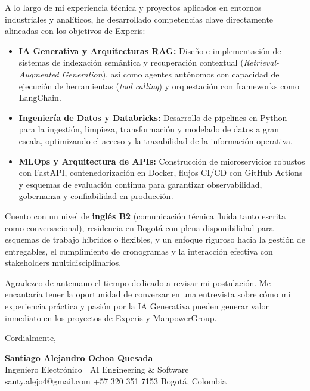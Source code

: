 \documentclass[11pt,a4paper]{article}
\begin{document}
A lo largo de mi experiencia técnica y proyectos aplicados en entornos industriales y analíticos, he desarrollado competencias clave directamente alineadas con los objetivos de Experis:

\begin{itemize}[label={\color{accentblue}\raisebox{0.2ex}{\tiny\faCircle}}, leftmargin=1.4em, itemsep=3pt, parsep=0pt, topsep=2pt]
    \item \textbf{IA Generativa y Arquitecturas RAG:} Diseño e implementación de sistemas de indexación semántica y recuperación contextual (\textit{Retrieval-Augmented Generation}), así como agentes autónomos con capacidad de ejecución de herramientas (\textit{tool calling}) y orquestación con frameworks como LangChain.
    \item \textbf{Ingeniería de Datos y Databricks:} Desarrollo de pipelines en Python para la ingestión, limpieza, transformación y modelado de datos a gran escala, optimizando el acceso y la trazabilidad de la información operativa.
    \item \textbf{MLOps y Arquitectura de APIs:} Construcción de microservicios robustos con FastAPI, contenedorización en Docker, flujos CI/CD con GitHub Actions y esquemas de evaluación continua para garantizar observabilidad, gobernanza y confiabilidad en producción.
\end{itemize}

Cuento con un nivel de \textbf{inglés B2} (comunicación técnica fluida tanto escrita como conversacional), residencia en Bogotá con plena disponibilidad para esquemas de trabajo híbridos o flexibles, y un enfoque riguroso hacia la gestión de entregables, el cumplimiento de cronogramas y la interacción efectiva con stakeholders multidisciplinarios.

Agradezco de antemano el tiempo dedicado a revisar mi postulación. Me encantaría tener la oportunidad de conversar en una entrevista sobre cómo mi experiencia práctica y pasión por la IA Generativa pueden generar valor inmediato en los proyectos de Experis y ManpowerGroup.

\vspace{10pt}
\noindent Cordialmente,

\vspace{12pt}
\noindent
\textbf{\large\color{accent} Santiago Alejandro Ochoa Quesada}\\
{\small\color{subtletext} Ingeniero Electrónico | AI Engineering \& Software}\\
{\footnotesize\color{subtletext} santy.alejo4@gmail.com \;\textbar\; +57 320 351 7153 \;\textbar\; Bogotá, Colombia}
\end{document}
